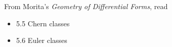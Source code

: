 \documentclass{homework}
\author{Jim Fowler}
\date{Week 13: Characteristic classes}
\begin{document}
\maketitle

From Morita's \textit{Geometry of Differential Forms}, read
\begin{itemize}
\item 5.5 Chern classes
\item 5.6 Euler classes
\end{itemize}
\end{document}
